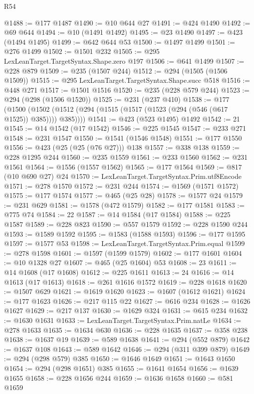 \begin{lexlean}{R54}
\begin{coremodule}
@1488 := @177 @1487
@1490 := @10 @644 @27
@1491 := @424 @1490
@1492 := @69 @644
@1494 := @10 (@1491 @1492)
@1495 := @23 @1490
@1497 := @423 (@1494 @1495)
@1499 := @642 @644 @53
@1500 := @1497 @1499
@1501 := @276 @1499
@1502 := @1501 @232
@1505 := @295 LexLeanTarget.TargetSyntax.Shape.zero @197
@1506 := @641 @1499
@1507 := @228 @879
@1509 := @235 (@1507 @244)
@1512 := @294 (@1505 (@1506 @1509))
@1515 := @295 LexLeanTarget.TargetSyntax.Shape.succ @518
@1516 := @448 @271
@1517 := @1501 @1516
@1520 := @235 (@228 @579 @244)
@1523 := @294 (@298 (@1506 @1520))
@1525 := @231 (@237 @410)
@1538 := @177
    (@1500 (@1502 (@1512 (@294 (@1515 (@1517 (@1523 (@294 (@546 (@617 @1525)) @385)))) @385))))
@1541 := @423 (@523 @1495) @1492
@1542 := 21
@1545 := @14 @1542 (@17 @1542)
@1546 := @225 @1545
@1547 := @233 @271
@1548 := @231 @1547
@1550 := @1541 (@1546 @1548)
@1551 := @177 @1550
@1556 := @423 (@25 (@25 (@76 @27))) @138
@1557 := @338 @138
@1559 := @228 @1295 @244
@1560 := @235 @1559
@1561 := @233 @1560
@1562 := @231 @1561
@1564 := @1556 (@1557 @1562)
@1565 := @177 @1564
@1569 := @817 (@10 @690 @27) @24
@1570 := LexLeanTarget.TargetSyntax.Prim.utf8Encode
@1571 := @278 @1570
@1572 := @231 @244
@1574 := @1569 (@1571 @1572)
@1575 := @177 @1574
@1577 := @465 (@25 @28)
@1578 := @1577 @24
@1579 := @231 @629
@1581 := @1578 (@472 @1579)
@1582 := @177 @1581
@1583 := @775 @74
@1584 := 22
@1587 := @14 @1584 (@17 @1584)
@1588 := @225 @1587
@1589 := @228 @823
@1590 := @557 @1579
@1592 := @228 @1590 @244
@1593 := @1589 @1592
@1595 := @1583 (@1588 @1593)
@1596 := @177 @1595
@1597 := @1577 @53
@1598 := LexLeanTarget.TargetSyntax.Prim.equal
@1599 := @278 @1598
@1601 := @1597 (@1599 @1579)
@1602 := @177 @1601
@1604 := @10 @1328 @27
@1607 := @465 (@25 @1604) @53
@1608 := 23
@1611 := @14 @1608 (@17 @1608)
@1612 := @225 @1611
@1613 := 24
@1616 := @14 @1613 (@17 @1613)
@1618 := @261 @1616 @1572
@1619 := @228 @1618
@1620 := @1507 @629
@1621 := @1619 @1620
@1623 := @1607 (@1612 @1621)
@1624 := @177 @1623
@1626 := @217 @115 @22
@1627 := @616 @234
@1628 := @1626 @1627
@1629 := @217 @137
@1630 := @1629 @324
@1631 := @615 @234
@1632 := @1630 @1631
@1633 := LexLeanTarget.TargetSyntax.Prim.natLe
@1634 := @278 @1633
@1635 := @1634 @630
@1636 := @228 @1635
@1637 := @358 @238
@1638 := @1637 @19
@1639 := @589 @1638
@1641 := @294 (@552 @879)
@1642 := @1637 @108
@1643 := @589 @1642
@1646 := @294 (@311 @399 @879)
@1649 := @294 (@298 @579) @385
@1650 := @1646 @1649
@1651 := @1643 @1650
@1654 := @294 (@298 @1651) @385
@1655 := @1641 @1654
@1656 := @1639 @1655
@1658 := @228 @1656 @244
@1659 := @1636 @1658
@1660 := @581 @1659

\end{coremodule}
\end{lexlean}
